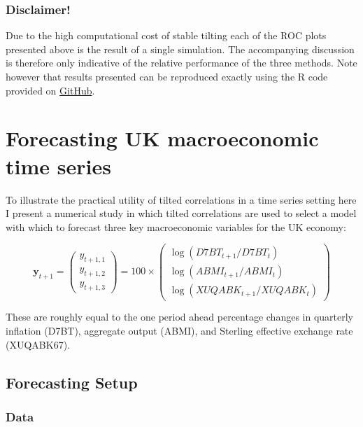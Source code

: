 \documentclass[11pt]{report}\usepackage[utf8]{inputenc}
\begin{document}
\subsubsection{Disclaimer!}

Due to the high computational cost of stable tilting each of the ROC plots presented above is the result of a single simulation. The accompanying discussion is therefore only indicative of the relative performance of the three methods. Note however that results presented can be reproduced exactly using the R code provided on \href{https://github.com/Shakeel95/ST499-Tilting-}{GitHub}. 

\section{Forecasting UK macroeconomic time series}

To illustrate the practical utility of tilted correlations in a time series setting here I present a numerical study in which tilted correlations are used to select a model with which to forecast three key macroeconomic variables for the UK economy: 

\begin{equation*}
    \boldsymbol{y}_{t+1} 
    =\begin{pmatrix}
    y_{t+1,1}\\ 
    y_{t+1,2}\\ 
    y_{t+1,3}
    \end{pmatrix}
    = 100 \times \begin{pmatrix}
    \log(D7BT_{t+1}/D7BT_{t})\\ 
    \log(ABMI_{t+1}/ABMI_{t})\\
    \log(XUQABK_{t+1}/XUQABK_{t}) 
    \end{pmatrix}
\end{equation*}

These are roughly equal to the one period ahead percentage changes in quarterly inflation (D7BT), aggregate output (ABMI), and Sterling effective exchange rate (XUQABK67).

\subsection{Forecasting Setup}

\subsubsection{Data}
\end{document}
